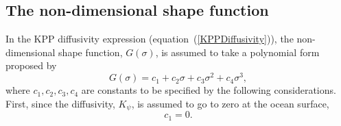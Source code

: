 \documentclass[preprint,12pt,authoryear]{agujournal}
\begin{document}
\subsection{The non-dimensional shape function} 
\label{subsection:non-dimensional-shape-function}
In the KPP diffusivity expression (equation~(\ref{KPPDiffusivity})), the non-dimensional shape function, $G(\sigma)$, is assumed to take a polynomial form proposed by \cite{OBrien1970}
\begin{equation}
\label{shape_func}
G(\sigma) = c_1 + c_2 \sigma + c_3 \sigma^2 + c_4 \sigma^3,
\end{equation}
where $c_1, c_2, c_3, c_4$ are constants to be specified by the following considerations. First, since the diffusivity, $K_\psi$, is assumed to go to zero at the ocean surface,
\begin{equation}
 c_1 = 0.
\end{equation}
 
\end{document}
